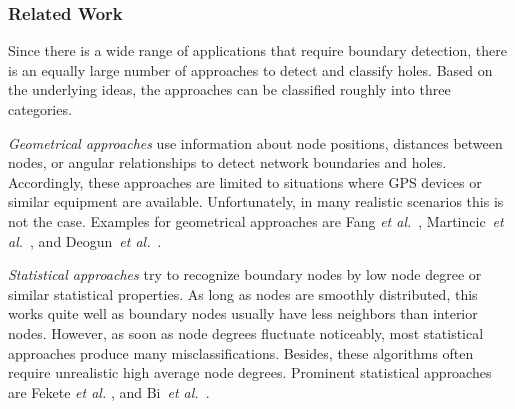 \documentclass{llncs}
\begin{document}
\subsubsection{Related Work}
Since there is a wide range of applications that require boundary detection, there is an equally large number of approaches to detect and classify holes.
Based on the underlying ideas, the approaches can be classified roughly into three categories.

\emph{Geometrical approaches} use information about node positions, distances between nodes, or angular relationships to detect network boundaries and holes.
Accordingly, these approaches are limited to situations where GPS devices or similar equipment are available.
Unfortunately, in many realistic scenarios this is not the case.
Examples for geometrical approaches are Fang \emph{et al.}~\cite{fgg04}, Martincic~\emph{et al.}~\cite{martincic04}, and Deogun~\emph{et al.}~\cite{deogun05}.

\emph{Statistical approaches} try to recognize boundary nodes by low node degree or similar statistical properties.
As long as nodes are smoothly distributed, this works quite well as boundary nodes usually have less neighbors than interior nodes.
However, as soon as node degrees fluctuate noticeably, most statistical approaches produce many misclassifications.
Besides, these algorithms often require unrealistic high average node degrees. Prominent statistical approaches are Fekete \emph{et al.} \cite{fkkl-brgsn-05,fkpfb04}, and Bi~\emph{et al.}~\cite{bi06}.
\end{document}
